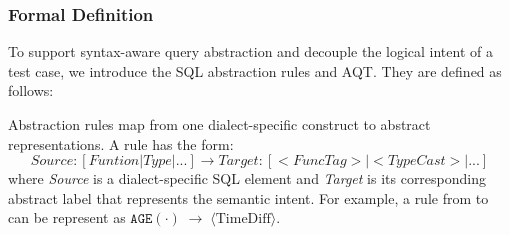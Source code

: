 \documentclass[sigconf,review,anonymous]{acmart}
\begin{document}
\subsubsection{Formal Definition}
To support syntax-aware query abstraction and decouple the logical intent of a test case, we introduce the SQL abstraction rules and AQT. 
They are defined as follows:
\vspace{-0.5cm}
\begin{list}{}{\setlength{\leftmargin}{0.5em}}
\item
    \begin{definition}\label{def:rules}
    Abstraction rules map from one dialect-specific construct to abstract representations. A rule has the form:
    \[
        Source: [Funtion | Type | ...] \rightarrow Target: [<FuncTag> | <TypeCast> | ...]
    \]
    where \textit{Source} is a dialect-specific SQL element and \textit{Target} is its corresponding abstract label that represents the semantic intent. For example, a rule from \pg{} to \duckdb{} can be represent as $\texttt{AGE}(\cdot) \;\rightarrow\; \langle \text{TimeDiff} \rangle$.
    
    \end{definition}



\end{list}
\end{document}
